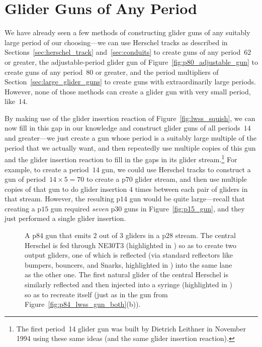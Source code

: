 \section{Glider Guns of Any Period}\label{sec:glider_gun_any_period}

We have already seen a few methods of constructing glider guns of any suitably large period of our choosing---we can use Herschel tracks as described in Sections~\ref{sec:herschel_track} and~\ref{sec:conduits} to create guns of any period~$62$ or greater, the adjustable-period glider gun of Figure~\ref{fig:p80_adjustable_gun} to create guns of any period~$80$ or greater, and the period multipliers of Section~\ref{sec:large_glider_guns} to create guns with extraordinarily large periods. However, none of those methods can create a glider gun with very small period, like~$14$.

By making use of the glider insertion reaction of Figure~\ref{fig:lwss_squish}, we can now fill in this gap in our knowledge and construct glider guns of all periods~$14$ and greater---we just create a gun whose period is a suitably large multiple of the period that we actually want, and then repeatedly use multiple copies of this gun and the glider insertion reaction to fill in the gaps in its glider stream.\footnote{The first period~14 glider gun was built by Dietrich Leithner in November 1994 using these same ideas (and the same glider insertion reaction).} For example, to create a period~$14$ gun, we could use Herschel tracks to construct a gun of period~$14 \times 5 = 70$ to create a p$70$ glider stream, and then use multiple copies of that gun to do glider insertion $4$ times between each pair of gliders in that stream. However, the resulting p$14$ gun would be quite large---recall that creating a p$15$ gun required \emph{seven} p$30$ guns in Figure~\ref{fig:p15_gun}, and they just performed a single glider insertion.

\begin{figure}[!htb]
	\centering
	\caption{A p$84$ gun that emits $2$ out of $3$ gliders in a p$28$ stream. The central Herschel is fed through NE30T3 (highlighted in ) so as to create two output gliders, one of which is reflected (via standard reflectors like bumpers, bouncers, and Snarks, highlighted in ) into the same lane as the other one. The first natural glider of the central Herschel is similarly reflected and then injected into a syringe (highlighted in ) so as to recreate itself (just as in the gun from Figure~\ref{fig:p84_lwss_gun_both}(b)).}
	\label{fig:p14_pieces_p84}
\end{figure}

